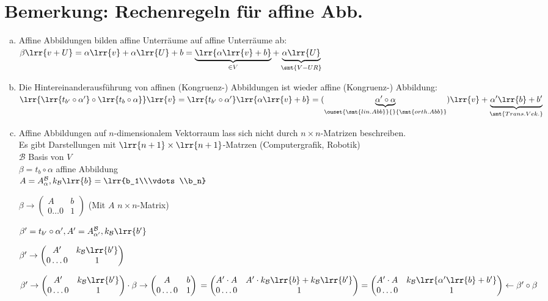 \section{Bemerkung: Rechenregeln für affine Abb.}
	\begin{enumerate}[a)]
		\item Affine Abbildungen bilden affine Unterräume auf affine Unterräume ab:\\
			$\beta\lrr{v+U}=\alpha\lrr{v}+\alpha\lrr{U}+b =\underbrace{\lrr{\alpha\lrr{v}+b}}_{\in V}+\underbrace{\alpha\lrr{U}}_{\smt{V-UR}}$
		\item Die Hintereinanderausführung von affinen (Kongruenz-) Abbildungen ist wieder affine (Kongruenz-) Abbildung:\\
			$\lrr{\lrr{t_{b'}\circ\alpha'}\circ\lrr{t_b\circ\alpha}}\lrr{v}=\lrr{t_{b'}\circ\alpha'}\lrr{\alpha\lrr{v}+b}=(\underbrace{\alpha'\circ\alpha}_{\ouset{\smt{lin.Abb}}{}{\smt{orth. Abb}}})\lrr{v}+\underbrace{\alpha'\lrr{b}+b'}_{\smt{Trans. Vek.}}$
		\item Affine Abbildungen auf $n$-dimensionalem Vektorraum lass sich nicht durch $n\times n$-Matrizen beschreiben.\\
			Es gibt Darstellungen mit $\lrr{n+1}\times\lrr{n+1}$-Matrzen (Computergrafik, Robotik)\\
			$\mathcal{B}$ Basis von $V$\\
			$\beta=t_b\circ\alpha$ affine Abbildung\\
			$A=A_\alpha^\mathcal{B}, k_\mathcal{B}\lrr{b}=\lrr{b_1\\\vdots\\b_n}$
			
			$\beta\rightarrow\begin{pmatrix}
				A&b\\0\dots 0&1
			\end{pmatrix}$ (Mit $A$ $n\times n$-Matrix)
			
			$\beta'=t_{b'}\circ\alpha', A'=A_{\alpha'}^\mathcal{B}, k_\mathcal{B}\lrr{b'}$
			
			$\beta'\rightarrow\begin{pmatrix}
				A'&k_\mathcal{B}\lrr{b'}\\0\dots 0&1
			\end{pmatrix}$
			
			$\beta'\rightarrow\begin{pmatrix}
				A'&k_\mathcal{B}\lrr{b'}\\0\dots 0&1
			\end{pmatrix}
			\cdot
			\beta\rightarrow\begin{pmatrix}
				A&b\\0\dots 0&1
			\end{pmatrix}\\
			=\begin{pmatrix}
				A'\cdot A&A'\cdot k_\mathcal{B}\lrr{b}+k_\mathcal{B}\lrr{b'}\\0\dots 0&1
			\end{pmatrix}
			=\begin{pmatrix}
				A'\cdot A&k_\mathcal{B}\lrr{\alpha'\lrr{b}+b'}\\0\dots 0&1
			\end{pmatrix}
			\leftarrow \beta'\circ\beta$
			

\end{enumerate}
